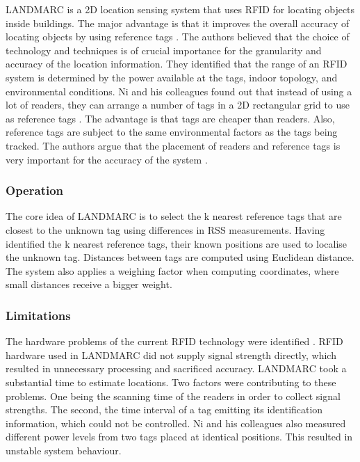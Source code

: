 LANDMARC is a 2D location sensing system that uses RFID for locating objects inside buildings. The major advantage is that it improves the overall accuracy of locating objects by using reference tags \cite{Ni2004}. The authors believed that the choice of technology and techniques is of crucial importance for the granularity and accuracy of the location information. They identified that the range of an RFID system is determined by the power available at the tags, indoor topology, and environmental conditions. Ni and his colleagues found out that instead of using a lot of readers, they can arrange a number of tags in a 2D rectangular grid to use as reference tags \cite{Ni2004}. The advantage is that tags are cheaper than readers. Also, reference tags are subject to the same environmental factors as the tags being tracked. The authors argue that the placement of readers and reference tags is very important for the accuracy of the system \cite{Ni2004}.

\subsubsection{Operation}

The core idea of LANDMARC is to select the k nearest reference tags that are closest to the unknown tag using differences in RSS measurements. Having identified the k nearest reference tags, their known positions are used to localise the unknown tag. Distances between tags are computed using Euclidean distance. The system also applies a weighing factor when computing coordinates, where small distances receive a bigger weight.

\subsubsection{Limitations}

The hardware problems of the current RFID technology were identified \cite{Ni2004}. RFID hardware used in LANDMARC did not supply signal strength directly, which resulted in unnecessary processing and sacrificed accuracy. LANDMARC took a substantial time to estimate locations. Two factors were contributing to these problems. One being the scanning time of the readers in order to collect signal strengths. The second, the time interval of a tag emitting its identification information, which could not be controlled. Ni and his colleagues also measured different power levels from two tags placed at identical positions. This resulted in unstable system behaviour.

